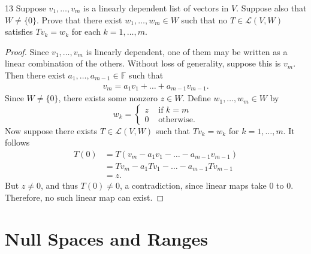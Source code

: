 \documentclass{extarticle}
\newenvironment{problem}[1]{\begin{prob*}{#1}{}}{\end{prob*}}
\newcommand{\F}{\mathbb{F}}
\newcommand{\Hom}{\mathcal{L}}
\begin{document}
\begin{problem}{13}
Suppose $v_1,\dots, v_m$ is a linearly dependent list of vectors in $V$.  Suppose also that $W\neq\{0\}$.  Prove that there exist $w_1,\dots, w_m\in W$ such that no $T\in\Hom(V,W)$ satisfies $Tv_k=w_k$ for each $k = 1,\dots, m$.
\end{problem}
\begin{proof}
Since $v_1,\dots,v_m$ is linearly dependent, one of them may be written as a linear combination of the others.  Without loss of generality, suppose this is $v_m$.  Then there exist $a_1,\dots,a_{m-1}\in\F$ such that
\begin{align*}
v_m = a_1v_1 + \dots + a_{m-1}v_{m-1}.
\end{align*}
Since $W\neq\{0\}$, there exists some nonzero $z\in W$.  Define $w_1,\dots,w_m\in W$ by
\begin{equation*}
w_k = \begin{cases}z &\text{ if }k = m\\ 0 &\text{ otherwise.} \end{cases}
\end{equation*}
Now suppose there exists $T\in\Hom(V,W)$ such that $Tv_k = w_k$ for $k = 1,\dots, m$.  It follows
\begin{align*}
T(0) &= T(v_m - a_1v_1 - \dots - a_{m-1}v_{m-1})\\
 &= Tv_m - a_1Tv_1 - \dots - a_{m-1}Tv_{m-1}\\
&= z.
\end{align*}
But $z\neq0$, and thus $T(0)\neq 0$, a contradiction, since linear maps take $0$ to $0$.  Therefore, no such linear map can exist.
\end{proof}



\section{Null Spaces and Ranges}
\end{document}
